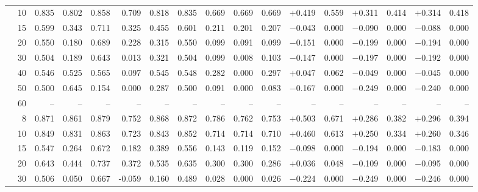 \documentclass[conference]{IEEEtran}
\theoremstyle{remark}
\begin{document}
\begin{table}[ht]
{\begin{tabular}{p{1.55cm}r rrrr rr rr r rr rr rr}
  & 10 & 0.835 & 0.802 & 0.858 & 0.709 & 0.818 & 0.835 & 0.669 & 0.669 & 0.669 & $+$0.419 & 0.559 & $+$0.311 & 0.414 & $+$0.314 & 0.418 \\
  & 15 & 0.599 & 0.343 & 0.711 & 0.325 & 0.455 & 0.601 & 0.211 & 0.201 & 0.207 & $-$0.043 & 0.000 & $-$0.090 & 0.000 & $-$0.088 & 0.000 \\
  & 20 & 0.550 & 0.180 & 0.689 & 0.228 & 0.315 & 0.550 & 0.099 & 0.091 & 0.099 & $-$0.151 & 0.000 & $-$0.199 & 0.000 & $-$0.194 & 0.000 \\
  & 30 & 0.504 & 0.189 & 0.643 & 0.013 & 0.321 & 0.504 & 0.099 & 0.008 & 0.103 & $-$0.147 & 0.000 & $-$0.197 & 0.000 & $-$0.192 & 0.000 \\
  & 40 & 0.546 & 0.525 & 0.565 & 0.097 & 0.545 & 0.548 & 0.282 & 0.000 & 0.297 & $+$0.047 & 0.062 & $-$0.049 & 0.000 & $-$0.045 & 0.000 \\
  & 50 & 0.500 & 0.645 & 0.154 & 0.000 & 0.287 & 0.500 & 0.091 & 0.000 & 0.083 & $-$0.167 & 0.000 & $-$0.249 & 0.000 & $-$0.240 & 0.000 \\
  & 60 & -- & -- & -- & -- & -- & -- & -- & -- & -- & -- & -- & -- & -- & -- & -- \\
\midrule
{}
  & 8 & 0.871 & 0.861 & 0.879 & 0.752 & 0.868 & 0.872 & 0.786 & 0.762 & 0.753 & $+$0.503 & 0.671 & $+$0.286 & 0.382 & $+$0.296 & 0.394 \\
  & 10 & 0.849 & 0.831 & 0.863 & 0.723 & 0.843 & 0.852 & 0.714 & 0.714 & 0.710 & $+$0.460 & 0.613 & $+$0.250 & 0.334 & $+$0.260 & 0.346 \\
  & 15 & 0.547 & 0.264 & 0.672 & 0.182 & 0.389 & 0.556 & 0.143 & 0.119 & 0.152 & $-$0.098 & 0.000 & $-$0.194 & 0.000 & $-$0.183 & 0.000 \\
  & 20 & 0.643 & 0.444 & 0.737 & 0.372 & 0.535 & 0.635 & 0.300 & 0.300 & 0.286 & $+$0.036 & 0.048 & $-$0.109 & 0.000 & $-$0.095 & 0.000 \\
  & 30 & 0.506 & 0.050 & 0.667 & -0.059 & 0.160 & 0.489 & 0.028 & 0.000 & 0.026 & $-$0.224 & 0.000 & $-$0.249 & 0.000 & $-$0.246 & 0.000 \\

\end{tabular}}
\end{table}
\end{document}
